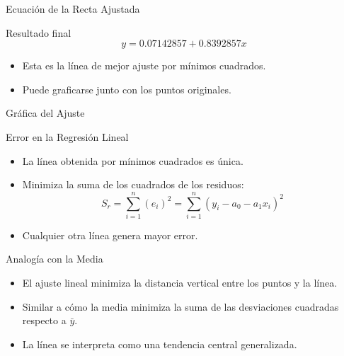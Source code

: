 \documentclass[main.tex]{subfiles}
\begin{document}
\begin{frame}{Ecuación de la Recta Ajustada}
  \begin{block}{Resultado final}
    \[
      y = 0.07142857 + 0.8392857x
    \]
  \end{block}
  \begin{itemize}
    \item Esta es la línea de mejor ajuste por mínimos cuadrados.
    \item Puede graficarse junto con los puntos originales.
  \end{itemize}
\end{frame}
\begin{frame}{Gráfica del Ajuste}
  \begin{center}
  \end{center}
\end{frame}

\begin{frame}{Error en la Regresión Lineal}
  \begin{itemize}
    \item La línea obtenida por mínimos cuadrados es única.
    \item Minimiza la suma de los cuadrados de los residuos:
    \[
      S_r =\sum_{i=1}^n (e_i)^2 = \sum_{i=1}^n (y_i - a_0 - a_1x_i)^2
    \]
    \item Cualquier otra línea genera mayor error.
  \end{itemize}
\end{frame}

\begin{frame}{Analogía con la Media}
  \begin{itemize}
    \item El ajuste lineal minimiza la distancia vertical entre los puntos y la línea.
    \item Similar a cómo la media minimiza la suma de las desviaciones cuadradas respecto a \(\bar{y}\).
    \item La línea se interpreta como una tendencia central generalizada.
  \end{itemize}
\end{frame}
\end{document}
